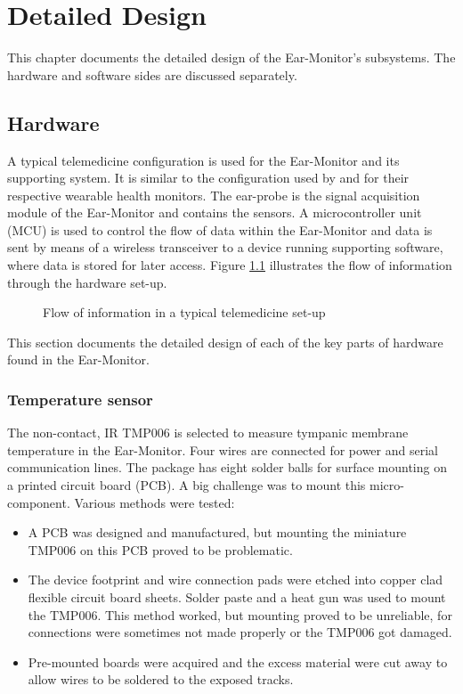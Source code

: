 \chapter{Detailed Design}
\label{chp:DetailedDesign}
This chapter documents the detailed design of the Ear-Monitor's subsystems. The hardware and software sides are discussed separately. 

\section{Hardware}

A typical telemedicine configuration is used for the Ear-Monitor and its supporting system. It is similar to the configuration used by \cite{wang2010wearable} and \cite{prawiro2016integrated} for their respective wearable health monitors. The ear-probe is the signal acquisition module of the Ear-Monitor and contains the sensors. A microcontroller unit (MCU) is used to control the flow of data within the Ear-Monitor and data is sent by means of a wireless transceiver to a device running supporting software, where data is stored for later access. Figure \ref{fig:HardwareFlowchart} illustrates the flow of information through the hardware set-up.

\begin{figure}[h]
\centering
\graphicspath{{figs/}}

\caption{Flow of information in a typical telemedicine set-up}
\label{fig:HardwareFlowchart}
\end{figure}

This section documents the detailed design of each of the key parts of hardware found in the Ear-Monitor.

\subsection{Temperature sensor}
The non-contact, IR TMP006 is selected to measure tympanic membrane temperature in the Ear-Monitor. Four wires are connected for power and serial communication lines. The package has eight solder balls for surface mounting on a printed circuit board (PCB). A big challenge was to mount this micro-component. Various methods were tested:

\begin{itemize}
\item A PCB was designed and manufactured, but mounting the miniature TMP006 on this PCB proved to be problematic.
\item The device footprint and wire connection pads were etched into copper clad flexible circuit board sheets. Solder paste and a heat gun was used to mount the TMP006. This method worked, but mounting proved to be unreliable, for connections were sometimes not made properly or the TMP006 got damaged.
\item Pre-mounted boards were acquired and the excess material were cut away to allow wires to be soldered to the exposed tracks.
\end{itemize}

